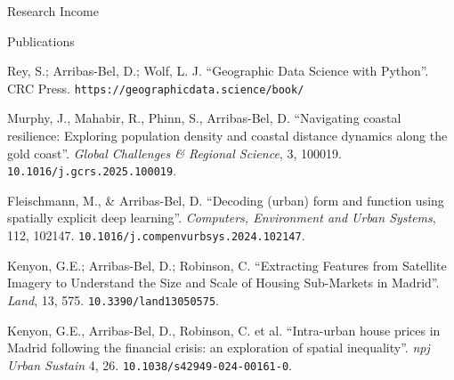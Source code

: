 \documentclass[12pt,2up]{article}
\begin{document}
\begin{cv}{}
\begin{cvlist}{Research Income}
\end{cvlist}
  \begin{cvlist}{Publications}
\item[\textbf{Books}]

\item[\textit{2023}] Rey, S.; Arribas-Bel, D.; Wolf, L. J.
        ``Geographic Data Science with Python''. CRC Press.
        \texttt{https://geographicdata.science/book/}

\item[\textbf{Peer-reviewed journal articles}]

\item[\textit{2025}] Murphy, J., Mahabir, R., Phinn, S., Arribas-Bel, D.
        ``Navigating coastal resilience: Exploring population density and
        coastal distance dynamics along the gold coast''.
        \emph{Global Challenges \& Regional Science}, 3, 100019.
        \texttt{10.1016/j.gcrs.2025.100019}.
\item[\textit{2024}] Fleischmann, M., \& Arribas-Bel, D. 
  ``Decoding (urban) form and function using spatially explicit deep learning''.
  \emph{Computers, Environment and Urban Systems}, 112, 102147.
  \texttt{10.1016/j.compenvurbsys.2024.102147}.
\item[] Kenyon, G.E.; Arribas-Bel, D.; Robinson, C. 
  ``Extracting Features from Satellite Imagery to Understand 
  the Size and Scale of Housing Sub-Markets in Madrid''. 
  \emph{Land}, 13, 575. \texttt{10.3390/land13050575}.
\item[] Kenyon, G.E., Arribas-Bel, D., Robinson, C. et al. 
  ``Intra-urban house prices in Madrid following the financial crisis: 
  an exploration of spatial inequality''. 
  \emph{npj Urban Sustain} 4, 26. 
  \texttt{10.1038/s42949-024-00161-0}.


\end{cvlist}
\end{cv}
\end{document}
